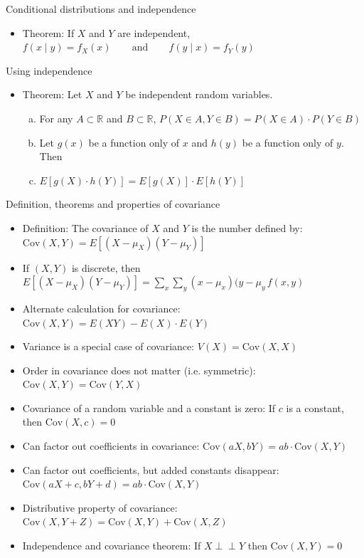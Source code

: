\documentclass{article}
\newcommand{\ind}{\perp \!\!\! \perp}			%
\newcommand{\cov}[1]{\mathrm{Cov}(#1)}		%
\begin{document}
Conditional distributions and independence
\begin{itemize}
    \item Theorem: If $X$ and $Y$ are independent, $f(x \mid y) = f_X(x) \hspace{25pt} \text{and} \hspace{25pt} f(y \mid x) = f_Y(y)$
\end{itemize}\bigskip

Using independence
\begin{itemize}
    \item Theorem: Let $X$ and $Y$ be independent random variables.
    \begin{enumerate}[(a)]
         \item For any $A \subset \mathbb{R}$ and $B\subset \mathbb{R}$, $P(X \in A,Y \in B) = P(X \in A) \cdot P(Y \in B)$
        \item Let $g(x)$ be a function only of $x$ and $h(y)$ be a function only of $y$. Then
        \item[] $E[g(X) \cdot h(Y)] = E[g(X)] \cdot E[h(Y)]$
    \end{enumerate}
\end{itemize}\bigskip\bigskip

Definition, theorems and properties of covariance
\begin{itemize}
    \item Definition: The covariance of $X$ and $Y$ is the number defined by: $\cov{X,Y} = E[(X - \mu_X)(Y - \mu_Y)]$
        \item If $(X,Y)$ is discrete, then $E[(X - \mu_X)(Y - \mu_Y)] = \sum_x \sum_y (x - \mu_x)(y - \mu_y \, f(x,y)$
        \item Alternate calculation for covariance: $\cov{X,Y} = E(XY) - E(X) \cdot E(Y)$
        \item Variance is a special case of covariance: $V(X) = \cov{X,X}$
        \item Order in covariance does not matter (i.e. symmetric): $\cov{X,Y} = \cov{Y,X}$
        \item Covariance of a random variable and a constant is zero: If $c$ is a constant, then $\cov{X,c} = 0$
        \item Can factor out coefficients in covariance: $\cov{aX,bY} = ab \cdot \cov{X,Y}$
        \item Can factor out coefficients, but added constants disappear: $\cov{aX + c,bY + d} = ab \cdot \cov{X,Y}$
        \item Distributive property of covariance: $\cov{X, Y + Z} = \cov{X,Y} + \cov{X,Z}$
        \item Independence and covariance theorem: If $X \ind Y$ then $\cov{X,Y} = 0$
\end{itemize}\bigskip
\end{document}
